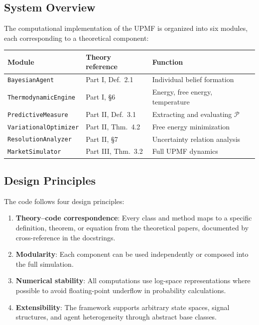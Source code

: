 \documentclass[12pt,a4paper]{article}
\theoremstyle{definition}
\newcommand{\PP}{\mathcal{P}}
\begin{document}
\subsection{System Overview}

The computational implementation of the UPMF is organized into six modules, each corresponding to a theoretical component:

\begin{center}
\begin{tabular}{lll}
\toprule
\textbf{Module} & \textbf{Theory reference} & \textbf{Function} \\
\midrule
\texttt{BayesianAgent} & Part I, Def.~2.1 & Individual belief formation \\
\texttt{ThermodynamicEngine} & Part I, \S 6 & Energy, free energy, temperature \\
\texttt{PredictiveMeasure} & Part II, Def.~3.1 & Extracting and evaluating $\PP$ \\
\texttt{VariationalOptimizer} & Part II, Thm.~4.2 & Free energy minimization \\
\texttt{ResolutionAnalyzer} & Part II, \S 7 & Uncertainty relation analysis \\
\texttt{MarketSimulator} & Part III, Thm.~3.2 & Full UPMF dynamics \\
\bottomrule
\end{tabular}
\end{center}

\subsection{Design Principles}

The code follows four design principles:
\begin{enumerate}[label=(\roman*)]
    \item \textbf{Theory--code correspondence}: Every class and method maps to a specific definition, theorem, or equation from the theoretical papers, documented by cross-reference in the docstrings.
    \item \textbf{Modularity}: Each component can be used independently or composed into the full simulation.
    \item \textbf{Numerical stability}: All computations use log-space representations where possible to avoid floating-point underflow in probability calculations.
    \item \textbf{Extensibility}: The framework supports arbitrary state spaces, signal structures, and agent heterogeneity through abstract base classes.
\end{enumerate}
\end{document}
